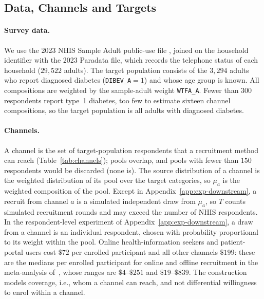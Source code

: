 \documentclass[twoside]{article}
\begin{document}
\subsection{Data, Channels and Targets}
\label{app:exp-data}

\paragraph{Survey data.} We use the 2023 NHIS Sample Adult public-use file
\cite{nhis2023}, joined on the household identifier with the 2023 Paradata
file, which records the telephone status of each household (\(29{,}522\)
adults). The target population consists of the \(3{,}294\) adults who report
diagnosed diabetes (\texttt{DIBEV\_A}\(=1\)) and whose age group is known.
All compositions are weighted by the sample-adult weight
\texttt{WTFA\_A}. Fewer than \(300\) respondents report type~1 diabetes,
too few to estimate sixteen channel compositions, so the target
population is all adults with diagnosed diabetes.

\paragraph{Channels.} A channel is the set of target-population
respondents that a recruitment method can reach
(Table~\ref{tab:channels}); pools overlap, and pools with fewer than
\(150\) respondents would be discarded (none is). The source distribution of
a channel is the weighted distribution of its pool over the target
categories, so \(\mu_a\) is the weighted composition of the pool. Except
in Appendix~\ref{app:exp-downstream}, a recruit from channel \(a\) is a
simulated independent draw from \(\mu_a\), so \(T\) counts simulated
recruitment rounds and may exceed the number of NHIS respondents. In the
respondent-level experiment of Appendix~\ref{app:exp-downstream}, a draw
from a channel is an individual respondent, chosen with probability
proportional to its weight within the pool. Online health-information
seekers and patient-portal users cost \(\$72\) per enrolled participant and
all other channels \(\$199\): these are the medians per enrolled participant
for online and offline recruitment in the meta-analysis
of~\cite{brogger2020online}, whose ranges are \(\$4\)--\(\$251\) and
\(\$19\)--\(\$839\). The construction models coverage, i.e., whom a channel
can reach, and not differential willingness to enrol within a channel.
\end{document}
